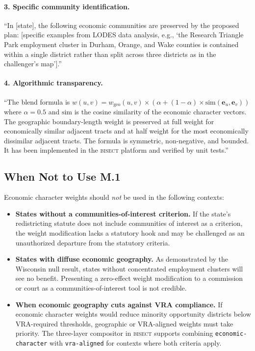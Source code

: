 \paragraph{3. Specific community identification.}
``In [state], the following economic communities are preserved by the
proposed plan: [specific examples from LODES data analysis, e.g.,
`the Research Triangle Park employment cluster in Durham, Orange, and
Wake counties is contained within a single district rather than split
across three districts as in the challenger's map'].''

\paragraph{4. Algorithmic transparency.}
``The blend formula is $w(u,v) = w_{\mathrm{geo}}(u,v) \times (\alpha +
(1-\alpha) \times \mathrm{sim}(\mathbf{e}_u, \mathbf{e}_v))$ where
$\alpha = 0.5$ and $\mathrm{sim}$ is the cosine similarity of the economic
character vectors.
The geographic boundary-length weight is preserved at full weight for
economically similar adjacent tracts and at half weight for the most
economically dissimilar adjacent tracts.
The formula is symmetric, non-negative, and bounded.
It has been implemented in the \textsc{bisect} platform and verified by
unit tests.''

\subsection{When Not to Use M.1}

Economic character weights should \emph{not} be used in the following contexts:

\begin{itemize}
  \item \textbf{States without a communities-of-interest criterion.}
    If the state's redistricting statute does not include communities of
    interest as a criterion, the weight modification lacks a statutory hook
    and may be challenged as an unauthorized departure from the statutory criteria.
  \item \textbf{States with diffuse economic geography.}
    As demonstrated by the Wisconsin null result, states without concentrated
    employment clusters will see no benefit.
    Presenting a zero-effect weight modification to a commission or court
    as a communities-of-interest tool is not credible.
  \item \textbf{When economic geography cuts against VRA compliance.}
    If economic character weights would reduce minority opportunity districts
    below VRA-required thresholds, geographic or VRA-aligned weights must
    take priority.
    The three-layer compositor in \textsc{bisect} supports combining
    \texttt{economic-character} with \texttt{vra-aligned} for contexts
    where both criteria apply.
\end{itemize}

